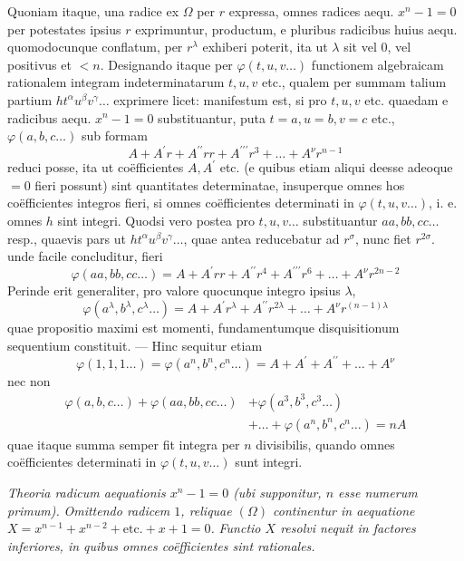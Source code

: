 Quoniam itaque, una radice ex \(\Omega\) per \(r\) expressa, omnes radices aequ. \(x^n-1=0\) per potestates ipsius \(r\) exprimuntur, productum, e pluribus radicibus huius aequ. quomodocunque conflatum, per \(r^\lambda\) exhiberi poterit, ita ut \(\lambda\) sit vel \(0\), vel positivus et \(<n\). Designando itaque per \(\varphi(t,\allowbreak u,\allowbreak v\ldots)\) functionem algebraicam rationalem integram indeterminatarum \(t,\allowbreak u,\allowbreak v\) etc., qualem per summam talium partium \(ht^\alpha u^\beta v^\gamma\ldots\) exprimere licet: manifestum est, si pro \(t,\allowbreak u,\allowbreak v\) etc. quaedam e radicibus aequ. \(x^n-1=0\) substituantur, puta \(t=a,\allowbreak u=b,\allowbreak v=c\) etc., \(\varphi(a,\allowbreak b,\allowbreak c\ldots)\) sub formam \[A+A^{\prime} r+A^{\prime\prime} rr+A^{\prime\prime\prime} r^3+\ldots+A^\nu r^{n-1}\] reduci posse, ita ut coëfficientes \(A,\allowbreak A^{\prime}\) etc. (e quibus etiam aliqui deesse adeoque \(=0\) fieri possunt) sint quantitates determinatae, insuperque omnes hos coëfficientes integros fieri, si omnes coëfficientes determinati in \(\varphi(t,\allowbreak u,\allowbreak v\ldots)\), i. e. omnes
\(h\) sint integri. Quodsi vero postea pro \(t,\allowbreak u,\allowbreak v\ldots\) substituantur \(aa,\allowbreak bb,\allowbreak cc\ldots\) resp., quaevis pars ut \(ht^\alpha u^\beta v^\gamma\ldots\), quae antea reducebatur ad \(r^\sigma\), nunc fiet \(r^{2\sigma}\). unde facile concluditur, fieri \[\varphi(aa,bb,cc\ldots)=A+A^{\prime} rr+A^{\prime\prime} r^4+A^{\prime\prime\prime} r^6+\ldots+A^\nu r^{2n-2}\] Perinde erit generaliter, pro valore quocunque integro ipsius \(\lambda\), \[\varphi(a^\lambda,b^\lambda,c^\lambda\ldots)=A+A^{\prime} r^\lambda+A^{\prime\prime} r^{2\lambda}+\ldots+A^\nu r^{(n-1)\lambda}\] quae propositio maximi est momenti, fundamentumque disquisitionum sequentium constituit. — Hinc sequitur etiam \[\varphi(1,1,1\ldots)=\varphi(a^n,b^n,c^n\ldots)=A+A^{\prime}+A^{\prime\prime}+\ldots+A^\nu\] nec non \[\begin{aligned}
\varphi(a,b,c\ldots)+\varphi(aa,bb,cc\ldots)&+\varphi(a^3,b^3,c^3\ldots)\\
&+\ldots+\varphi(a^n,b^n,c^n\ldots)=nA
\end{aligned}\] quae itaque summa semper fit integra per \(n\) divisibilis, quando omnes coëfficientes determinati in \(\varphi(t,\allowbreak u,\allowbreak v\ldots)\) sunt integri.

\begin{center}\textit{Theoria radicum aequationis \(x^n-1=0\) (ubi supponitur, \(n\) esse numerum primum).} \textit{Omittendo radicem \(1\), reliquae \((\Omega)\) continentur in aequatione \(X=x^{n-1}+x^{n-2}+\mathrm{etc.}+x+1=0\).} \textit{Functio \(X\) resolvi nequit in factores inferiores, in quibus omnes coëfficientes sint rationales.}\end{center}



